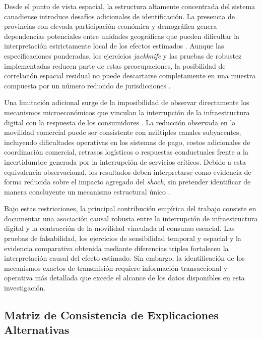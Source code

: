 Desde el punto de vista espacial, la estructura altamente concentrada del sistema canadiense introduce desaf\'ios adicionales de identificaci\'on. La presencia de provincias con elevada participaci\'on econ\'omica y demogr\'afica genera dependencias potenciales entre unidades geogr\'aficas que pueden dificultar la interpretaci\'on estrictamente local de los efectos estimados \citep{anselin1988spatial, cressie1991}. Aunque las especificaciones ponderadas, los ejercicios \textit{jackknife} y las pruebas de robustez implementadas reducen parte de estas preocupaciones, la posibilidad de correlaci\'on espacial residual no puede descartarse completamente en una muestra compuesta por un n\'umero reducido de jurisdicciones \citep{ferman2019inference, mackinnon2020randomization}.

Una limitaci\'on adicional surge de la imposibilidad de observar directamente los mecanismos microecon\'omicos que vinculan la interrupci\'on de la infraestructura digital con la respuesta de los consumidores \citep{kleinberg-networks-book, newman2010networks, chandrasekhar2025multiplexing, barabasi2016network}. La reducci\'on observada en la movilidad comercial puede ser consistente con m\'ultiples canales subyacentes, incluyendo dificultades operativas en los sistemas de pago, costos adicionales de coordinaci\'on comercial, retrasos log\'isticos o respuestas conductuales frente a la incertidumbre generada por la interrupci\'on de servicios cr\'iticos. Debido a esta equivalencia observacional, los resultados deben interpretarse como evidencia de forma reducida sobre el impacto agregado del \textit{shock}, sin pretender identificar de manera concluyente un mecanismo estructural \'unico \citep{angrist2009mostly, cunningham2021causal, heckman1989choosing}.

Bajo estas restricciones, la principal contribuci\'on emp\'irica del trabajo consiste en documentar una asociaci\'on causal robusta entre la interrupci\'on de infraestructura digital y la contracci\'on de la movilidad vinculada al consumo esencial. Las pruebas de falsabilidad, los ejercicios de sensibilidad temporal y espacial y la evidencia comparativa obtenida mediante diferencias triples fortalecen la interpretaci\'on causal del efecto estimado. Sin embargo, la identificaci\'on de los mecanismos exactos de transmisi\'on requiere informaci\'on transaccional y operativa m\'as detallada que excede el alcance de los datos disponibles en esta investigaci\'on.

\subsection{Matriz de Consistencia de Explicaciones Alternativas}\label{sec:7_2}

